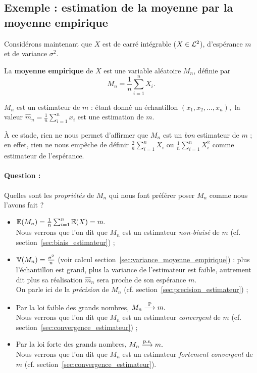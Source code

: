 \subsection{Exemple : estimation de la moyenne par la moyenne empirique}
Considérons maintenant que $X$ est de carré intégrable ($X \in \mathcal{L}^2$),
d'espérance $m$ et de variance $\sigma^2$.

La \textbf{moyenne empirique} de $X$ est une variable aléatoire $M_n$, définie
par
\begin{equation}
  M_n = \frac1n \sum_{i=1}^n X_i.
  \label{eq:moyenne_empirique}
\end{equation}

$M_n$ est un estimateur de $m$ : étant donné un échantillon
$(x_1, x_2, \dots, x_n),$ la valeur $\hat{m}_n = \frac1n \sum_{i=1}^n x_i$ est
une estimation de $m$.

À ce stade, rien ne nous permet d'affirmer que $M_n$ est un \textit{bon}
estimateur de $m$ ; en effet, rien ne nous empêche de définir
$\frac2n \sum_{i=1}^n X_i$ ou $\frac1n \sum_{i=1}^n X_i^2$ comme estimateur de l'espérance.


\paragraph{Question :} Quelles sont les \textit{propriétés} de $M_n$
qui nous font préférer poser $M_n$ comme nous l'avons fait ?

\begin{answer}
  \begin{itemize}
  \item $\mathbb{E}(M_n) = \frac1n \sum_{i=1}^n \mathbb{E}(X) = m.$ \\Nous verrons que l'on dit que $M_n$ est un estimateur
    \textit{non-biaisé} de $m$ (cf. section~\ref{sec:biais_estimateur}) ;
  \item $\mathbb{V}(M_n) = \frac{\sigma^2}{n}$ (voir calcul
    section~\ref{sec:variance_moyenne_empirique}) : plus l'échantillon est
    grand, plus la variance de l'estimateur est faible, autrement dit plus sa
    réalisation $\hat{m}_n$ sera proche de son espérance $m$. \\On parle ici de
    la \textit{précision} de $M_n$ (cf. section~\ref{sec:precision_estimateur})
    ;
  \item Par la loi faible des grands nombres, $M_n \stackrel{\mathbb{P}}{\longrightarrow} m.$ \\Nous verrons
    que l'on dit que $M_n$ est un estimateur \textit{convergent} de $m$
    (cf. section~\ref{sec:convergence_estimateur}) ;
  \item Par la loi forte des grands nombres, $M_n \stackrel{\text{p.s.}}{\longrightarrow} m.$ \\Nous verrons que
    l'on dit que $M_n$ est un estimateur \textit{fortement convergent} de $m$
    (cf. section~\ref{sec:convergence_estimateur}).
  \end{itemize}
\end{answer}


